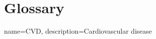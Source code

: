 \chapter{Glossary}

 {
    name=CVD, 
    description={Cardiovascular disease}
    }
    
   
    
    
    
    



